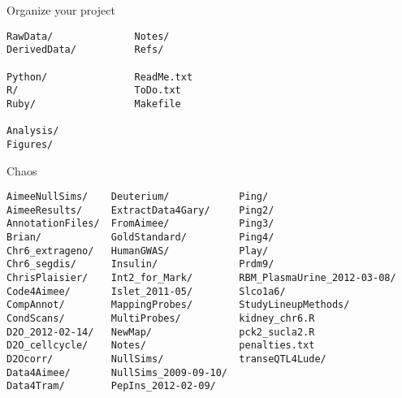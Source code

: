 \documentclass[aspectratio=169,12pt,t]{beamer}
\begin{document}
\begin{frame}[fragile,c]{Organize your project}

\begin{center}
\begin{minipage}[c]{10.3cm}
\begin{semiverbatim}
\lstset{basicstyle=\normalsize}
\begin{lstlisting}[linewidth=10.3cm]
RawData/              Notes/
DerivedData/          Refs/

Python/               ReadMe.txt
R/                    ToDo.txt
Ruby/                 Makefile

Analysis/
Figures/
\end{lstlisting}
\end{semiverbatim}
\end{minipage}
\end{center}


\end{frame}




\begin{frame}[fragile,c]{Chaos}

\begin{center}
\begin{minipage}[c]{11.33cm}
\begin{semiverbatim}
\lstset{basicstyle=\scriptsize}
\begin{lstlisting}[linewidth=11.33cm]
AimeeNullSims/    Deuterium/            Ping/
AimeeResults/     ExtractData4Gary/     Ping2/
AnnotationFiles/  FromAimee/            Ping3/
Brian/            GoldStandard/         Ping4/
Chr6_extrageno/   HumanGWAS/            Play/
Chr6_segdis/      Insulin/              Prdm9/
ChrisPlaisier/    Int2_for_Mark/        RBM_PlasmaUrine_2012-03-08/
Code4Aimee/       Islet_2011-05/        Slco1a6/
CompAnnot/        MappingProbes/        StudyLineupMethods/
CondScans/        MultiProbes/          kidney_chr6.R
D2O_2012-02-14/   NewMap/               pck2_sucla2.R
D2O_cellcycle/    Notes/                penalties.txt
D2Ocorr/          NullSims/             transeQTL4Lude/
Data4Aimee/       NullSims_2009-09-10/
Data4Tram/        PepIns_2012-02-09/
\end{lstlisting}
\end{semiverbatim}
\end{minipage}
\end{center}


\end{frame}
\end{document}
